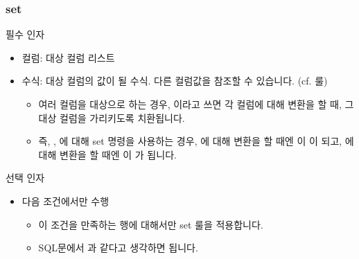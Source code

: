 \documentclass[letterpaper,10pt,english]{sphinxmanual}
\begin{document}
\subsubsection{set}
\label{\detokenize{discovery/part07/rule_kinds:set}}
\begin{figure}[H]
\centering

\noindent{}
\end{figure}

필수 인자
\begin{itemize}
\item {} 
컬럼: 대상 컬럼 리스트

\item {} 
수식: 대상 컬럼의 값이 될 수식. 다른 컬럼값을 참조할 수 있습니다. (cf. {\hyperref[\detokenize{discovery/part07/rule_kinds:replace}]{}} 룰)
\begin{itemize}
\item {} 
여러 컬럼을 대상으로 하는 경우, 이라고 쓰면 각 컬럼에 대해 변환을 할 때, 그 대상 컬럼을 가리키도록 치환됩니다.

\item {} 
즉, , 에 대해 set 명령을 사용하는 경우, 에 대해 변환을 할 때엔 이 이 되고, 에 대해 변환을 할 때엔 이 가 됩니다.

\end{itemize}

\end{itemize}

선택 인자
\begin{itemize}
\item {} 
다음 조건에서만 수행
\begin{itemize}
\item {} 
이 조건을 만족하는 행에 대해서만 set 룰을 적용합니다.

\item {} 
SQL문에서 과 같다고 생각하면 됩니다.

\end{itemize}

\end{itemize}
\end{document}
